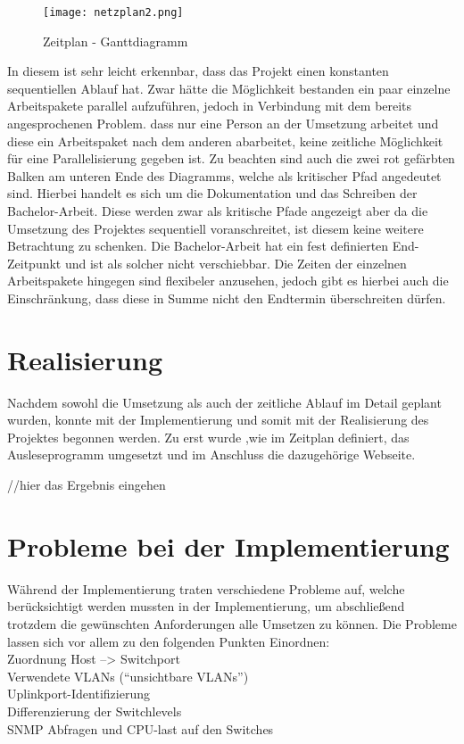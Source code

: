 \begin{figure}[H]
\centering
\texttt{[image: netzplan2.png]}
\caption{Zeitplan - Ganttdiagramm}
\label{fig:benchsnmpbulk}
\end{figure}

In diesem ist sehr leicht erkennbar, dass das Projekt einen konstanten sequentiellen Ablauf hat.
Zwar hätte die Möglichkeit bestanden ein paar einzelne Arbeitspakete parallel aufzuführen, jedoch in Verbindung mit dem bereits angesprochenen Problem. dass nur eine Person an der Umsetzung arbeitet und diese ein Arbeitspaket nach dem anderen abarbeitet, keine zeitliche Möglichkeit für eine Parallelisierung gegeben ist.
Zu beachten sind auch die zwei rot gefärbten Balken am unteren Ende des Diagramms, welche als kritischer Pfad angedeutet sind. Hierbei handelt es sich um die Dokumentation und das Schreiben der Bachelor-Arbeit. Diese werden zwar als kritische Pfade angezeigt aber da die Umsetzung des Projektes sequentiell voranschreitet, ist diesem keine weitere Betrachtung zu schenken. Die Bachelor-Arbeit hat ein fest definierten End-Zeitpunkt und ist als solcher nicht verschiebbar. Die Zeiten der einzelnen Arbeitspakete hingegen sind flexibeler anzusehen, jedoch gibt es hierbei auch die Einschränkung, dass diese in Summe nicht den Endtermin überschreiten dürfen.

\section{Realisierung}
\label{sec:implementation}

Nachdem sowohl die Umsetzung als auch der zeitliche Ablauf im Detail geplant wurden, konnte mit der Implementierung und somit mit der Realisierung des Projektes begonnen werden.
Zu erst wurde ,wie im Zeitplan definiert, das Ausleseprogramm umgesetzt und im Anschluss die dazugehörige Webseite.

//hier das Ergebnis eingehen

\section{Probleme bei der Implementierung}
\label{sec:probimp}

Während der Implementierung traten verschiedene Probleme auf, welche berücksichtigt werden mussten in der Implementierung, um abschließend trotzdem die gewünschten Anforderungen alle Umsetzen zu können.
Die Probleme lassen sich vor allem zu den folgenden Punkten Einordnen:\\
Zuordnung Host --> Switchport\\
Verwendete VLANs (“unsichtbare VLANs”)\\
Uplinkport-Identifizierung\\
Differenzierung der Switchlevels\\
SNMP Abfragen und CPU-last auf den Switches\\


